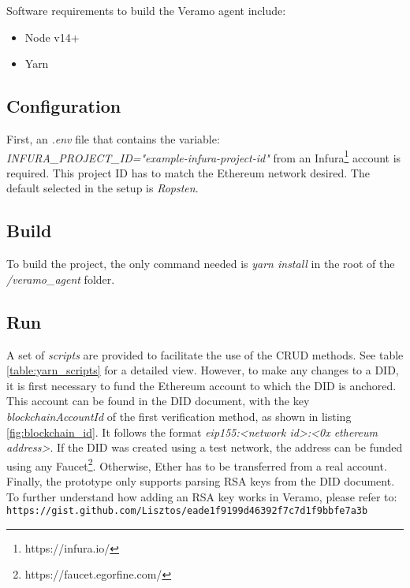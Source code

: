 Software requirements to build the Veramo agent include: 
\begin{itemize}
  \item Node v14+
  \item Yarn
\end{itemize}

\subsection{Configuration}
First, an \emph{.env} file that contains the variable: \emph{INFURA\_PROJECT\_ID="example-infura-project-id"} from an Infura\footnote{https://infura.io/} account is required. This project ID has to match the Ethereum network desired. The default selected in the setup is \emph{Ropsten}.

\subsection{Build}
To build the project, the only command needed is \emph{yarn install} in the root of the \emph{/veramo\_agent} folder. 

\subsection{Run}
A set of \emph{scripts} are provided to facilitate the use of the CRUD methods. See table \ref{table:yarn_scripts} for a detailed view. However, to make any changes to a DID, it is first necessary to fund the Ethereum account to which the DID is anchored. This account can be found in the DID document, with the key \emph{blockchainAccountId} of the first verification method, as shown in listing \ref{fig:blockchain_id}. It follows the format  \emph{eip155:<network id>:<0x ethereum address>}. If the DID was created using a test network, the address can be funded using any Faucet\footnote{https://faucet.egorfine.com/}. Otherwise, Ether has to be transferred from a real account.
Finally, the prototype only supports parsing RSA keys from the DID document. To further understand how adding an RSA key works in Veramo, please refer to:\\
 \verb|https://gist.github.com/Lisztos/eade1f9199d46392f7c7d1f9bbfe7a3b|


